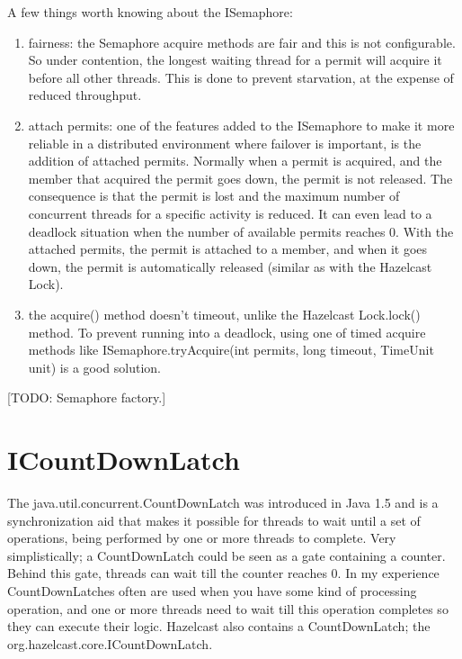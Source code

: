 A few things worth knowing about the ISemaphore:
\begin{enumerate}
\item fairness: the Semaphore acquire methods are fair and this is not configurable. So under contention, the longest waiting thread for a permit will acquire it before all other threads. This is done to prevent starvation, at the expense of reduced throughput.
\item attach permits: one of the features added to the ISemaphore to make it more reliable in a distributed environment where failover is important, is the addition of attached permits. Normally when a permit is acquired, and the member that acquired the permit goes down, the permit is not released. The consequence is that the permit is lost and the maximum number of concurrent threads for a specific activity is reduced. It can even lead to a deadlock situation when the number of available permits reaches 0. With the attached permits, the permit is attached to a member, and when it goes down, the permit is automatically released (similar as with the Hazelcast Lock).
\item the acquire() method doesn't timeout, unlike the Hazelcast Lock.lock() method. To prevent running into a deadlock, using one of timed acquire methods like ISemaphore.tryAcquire(int permits, long timeout, TimeUnit unit) is a good solution.
\end{enumerate}

[TODO: Semaphore factory.]

\section{ICountDownLatch}
The java.util.concurrent.CountDownLatch was introduced in Java 1.5 and is a synchronization aid that makes it possible for threads to wait until a set of operations, being performed by one or more threads to complete. Very simplistically; a CountDownLatch could be seen as a gate containing a counter. Behind this gate, threads can wait till the counter reaches 0. In my experience CountDownLatches often are used when you have some kind of processing operation, and one or more threads need to wait till this operation completes so they can execute their logic. Hazelcast also contains a CountDownLatch; the org.hazelcast.core.ICountDownLatch.

